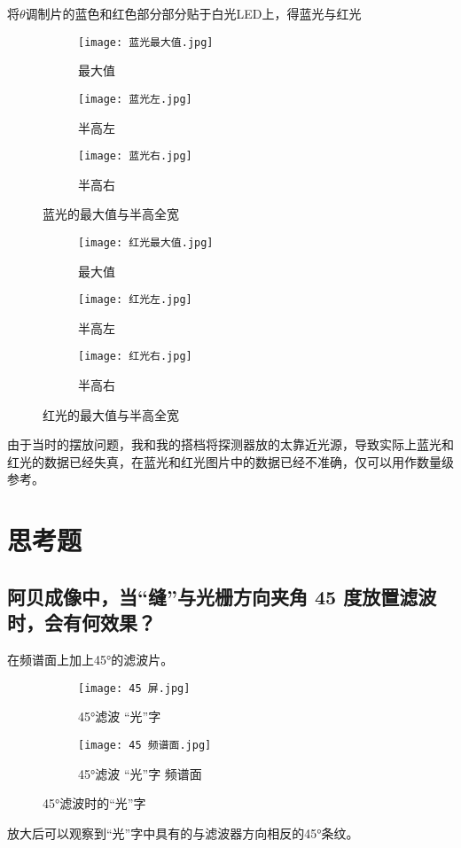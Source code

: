 \documentclass[11pt]{article}
\begin{document}
	将$\theta$调制片的蓝色和红色部分部分贴于白光LED上，得蓝光与红光
	\begin{figure}[H]
		\centering
		\begin{subfigure}{0.32\textwidth}
			\texttt{[image: 蓝光最大值.jpg]}
			\caption{最大值}
		\end{subfigure}
		\begin{subfigure}{0.32\textwidth}
			\texttt{[image: 蓝光左.jpg]}
			\caption{半高左}
		\end{subfigure}
		\begin{subfigure}{0.32\textwidth}
			\texttt{[image: 蓝光右.jpg]}
			\caption{半高右}
		\end{subfigure}
		\caption{蓝光的最大值与半高全宽}
		\label{fig:蓝}
	\end{figure}
	
	\begin{figure}[H]
		\centering
		\begin{subfigure}{0.32\textwidth}
			\texttt{[image: 红光最大值.jpg]}
			\caption{最大值}
		\end{subfigure}
		\begin{subfigure}{0.32\textwidth}
			\texttt{[image: 红光左.jpg]}
			\caption{半高左}
		\end{subfigure}
		\begin{subfigure}{0.32\textwidth}
			\texttt{[image: 红光右.jpg]}
			\caption{半高右}
		\end{subfigure}
		\caption{红光的最大值与半高全宽}
		\label{fig:红}
	\end{figure}
	
	由于当时的摆放问题，我和我的搭档将探测器放的太靠近光源，导致实际上蓝光和红光的数据已经失真，在蓝光和红光图片中的数据已经不准确，仅可以用作数量级参考。
	
	\section{思考题}
	\subsection{阿贝成像中，当“缝”与光栅方向夹角 45 度放置滤波时，会有何效果？}
	在频谱面上加上45°的滤波片。
	
	\begin{figure}[H]
		\centering
		\begin{subfigure}[t]{0.45\textwidth}  %
			\centering
			\texttt{[image: 45 屏.jpg]}  %
			\caption{45°滤波 “光”字}
		\end{subfigure}
		\begin{subfigure}[t]{0.45\textwidth}  %
			\centering
			\texttt{[image: 45 频谱面.jpg]}  %
			\caption{45°滤波 “光”字 频谱面}
		\end{subfigure}
		\caption{45°滤波时的“光”字}
		\label{fig:45滤波_光字}
	\end{figure}
	放大后可以观察到“光”字中具有的与滤波器方向相反的45°条纹。
	
\end{document}
